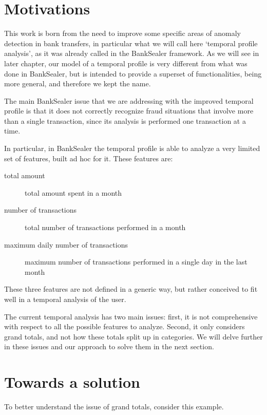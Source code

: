 
\section{Motivations}

This work is born from the need to improve some specific areas of anomaly detection in bank transfers, in particular what we will call here `temporal profile analysis', as it was already called in the BankSealer framework. As we will see in later chapter, our model of a temporal profile is very different from what was done in BankSealer, but is intended to provide a superset of functionalities, being more general, and therefore we kept the name.

The main BankSealer issue that we are addressing with the improved temporal profile is that it does not correctly recognize fraud situations that involve more than a single transaction, since its analysis is performed one transaction at a time.

In particular, in BankSealer the temporal profile is able to analyze a very limited set of features, built ad hoc for it. These features are:
\begin{description}
  \item[total amount] total amount spent in a month
  \item[number of transactions] total number of transactions performed in a month
  \item[maximum daily number of transactions] maximum number of transactions performed in a single day in the last month
\end{description}

These three features are not defined in a generic way, but rather conceived to fit well in a temporal analysis of the user.

The current temporal analysis has two main issues: first, it is not comprehensive with respect to all the possible features to analyze. Second, it only considers grand totals, and not how these totals split up in categories. We will delve further in these issues and our approach to solve them in the next section.

\section{Towards a solution}

To better understand the issue of grand totals, consider this example.

